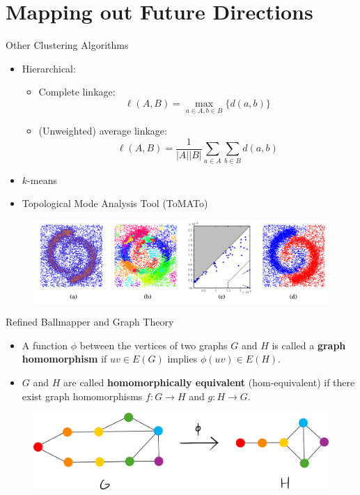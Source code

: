 \documentclass{beamer}
\begin{document}
\section{Mapping out Future Directions}
\begin{frame}{Other Clustering Algorithms}
  \begin{itemize}
    \item Hierarchical:
    \begin{itemize}
      \item Complete linkage: $$\ell(A, B) = \max_{a\in A, b\in B}\{d(a,b)\}$$
      \item (Unweighted) average linkage: $$\ell(A,B) = \frac{1}{|A||B|}\sum_{a\in A}\sum_{b\in B}d(a,b)$$
    \end{itemize}
    \item $k$-means
    \item Topological Mode Analysis Tool (ToMATo) \cite{tomato}

  \end{itemize}
  \begin{figure}
    \begin{center}
      \includegraphics[width=1\textwidth]{tdaclusters.png}
    \end{center}
  \end{figure}
\end{frame}


\begin{frame}{Refined Ballmapper and Graph Theory}
  \begin{itemize}
    \item A function $\phi$ between the vertices of two graphs $G$ and $H$ is called a \textbf{graph homomorphism} if $uv\in E(G)$ implies $\phi(uv)\in E(H)$.
    \item $G$ and $H$ are called \textbf{homomorphically equivalent} (hom-equivalent) if there exist graph homomorphisms $f: G\to H$ and $g: H\to G$.
  \end{itemize}
  \begin{figure}
    \begin{center}
      \includegraphics[width=1\textwidth]{graphhomo.png}
    \end{center}
  \end{figure}
\end{frame}
\end{document}

